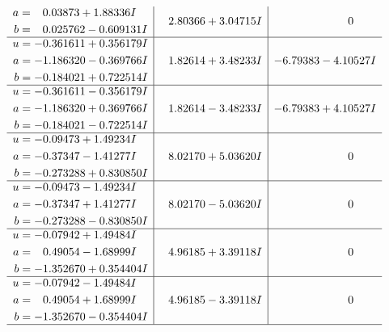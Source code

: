 \documentclass[1p]{elsarticle_modified}
\theoremstyle{definition}
\begin{document}
$$\begin{array}{c|c|c}
\begin{aligned}
a &= \phantom{-}0.03873 + 1.88336 I \\
b &= \phantom{-}0.025762 - 0.609131 I\end{aligned}
 & \phantom{-}2.80366 + 3.04715 I & \phantom{-0.000000 } 0 \\ \hline\begin{aligned}
u &= -0.361611 + 0.356179 I \\
a &= -1.186320 - 0.369766 I \\
b &= -0.184021 + 0.722514 I\end{aligned}
 & \phantom{-}1.82614 + 3.48233 I & -6.79383 - 4.10527 I \\ \hline\begin{aligned}
u &= -0.361611 - 0.356179 I \\
a &= -1.186320 + 0.369766 I \\
b &= -0.184021 - 0.722514 I\end{aligned}
 & \phantom{-}1.82614 - 3.48233 I & -6.79383 + 4.10527 I \\ \hline\begin{aligned}
u &= -0.09473 + 1.49234 I \\
a &= -0.37347 - 1.41277 I \\
b &= -0.273288 + 0.830850 I\end{aligned}
 & \phantom{-}8.02170 + 5.03620 I & \phantom{-0.000000 } 0 \\ \hline\begin{aligned}
u &= -0.09473 - 1.49234 I \\
a &= -0.37347 + 1.41277 I \\
b &= -0.273288 - 0.830850 I\end{aligned}
 & \phantom{-}8.02170 - 5.03620 I & \phantom{-0.000000 } 0 \\ \hline\begin{aligned}
u &= -0.07942 + 1.49484 I \\
a &= \phantom{-}0.49054 - 1.68999 I \\
b &= -1.352670 + 0.354404 I\end{aligned}
 & \phantom{-}4.96185 + 3.39118 I & \phantom{-0.000000 } 0 \\ \hline\begin{aligned}
u &= -0.07942 - 1.49484 I \\
a &= \phantom{-}0.49054 + 1.68999 I \\
b &= -1.352670 - 0.354404 I\end{aligned}
 & \phantom{-}4.96185 - 3.39118 I & \phantom{-0.000000 } 0\\
 \hline 

\end{array}$$
\end{document}
